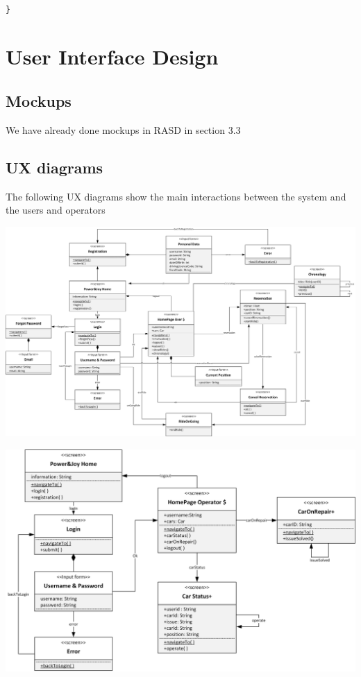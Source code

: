 \documentclass{article}
\begin{document}
\begin{flushleft}
\begin{lstlisting}
	
}
\end{lstlisting}

\section{User Interface Design} %
\subsection{Mockups}%
We have already done mockups in RASD in section 3.3\break
\newpage
\subsection{UX diagrams} %
The following UX diagrams show the main interactions between the system and the users and operators\break


\includegraphics[scale=0.3]{FinalUserUx} \break
 



\includegraphics[scale=0.5]{FinalOperatorUx} 
\newpage

\end{flushleft}
\end{document}
